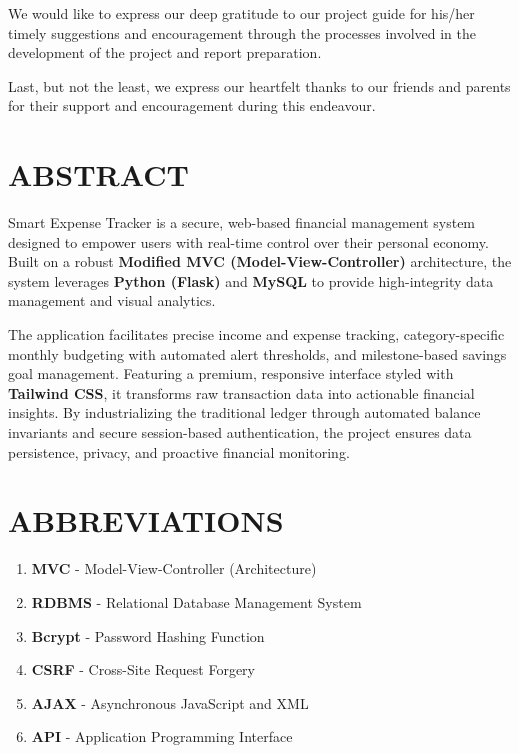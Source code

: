 \documentclass[12pt,a4paper]{article}
\begin{document}
We would like to express our deep gratitude to our project guide for his/her timely suggestions and encouragement through the processes involved in the development of the project and report preparation.

Last, but not the least, we express our heartfelt thanks to our friends and parents for their support and encouragement during this endeavour.

\newpage

\section*{ABSTRACT}
Smart Expense Tracker is a secure, web-based financial management system designed to empower users with real-time control over their personal economy. Built on a robust \textbf{Modified MVC (Model-View-Controller)} architecture, the system leverages \textbf{Python (Flask)} and \textbf{MySQL} to provide high-integrity data management and visual analytics. 

The application facilitates precise income and expense tracking, category-specific monthly budgeting with automated alert thresholds, and milestone-based savings goal management. Featuring a premium, responsive interface styled with \textbf{Tailwind CSS}, it transforms raw transaction data into actionable financial insights. By industrializing the traditional ledger through automated balance invariants and secure session-based authentication, the project ensures data persistence, privacy, and proactive financial monitoring.

\newpage

\tableofcontents
\newpage

\listoffigures
\newpage

\section*{ABBREVIATIONS}
\begin{enumerate}
    \item \textbf{MVC} - Model-View-Controller (Architecture)
    \item \textbf{RDBMS} - Relational Database Management System
    \item \textbf{Bcrypt} - Password Hashing Function
    \item \textbf{CSRF} - Cross-Site Request Forgery
    \item \textbf{AJAX} - Asynchronous JavaScript and XML
    \item \textbf{API} - Application Programming Interface
\end{enumerate}
\end{document}

